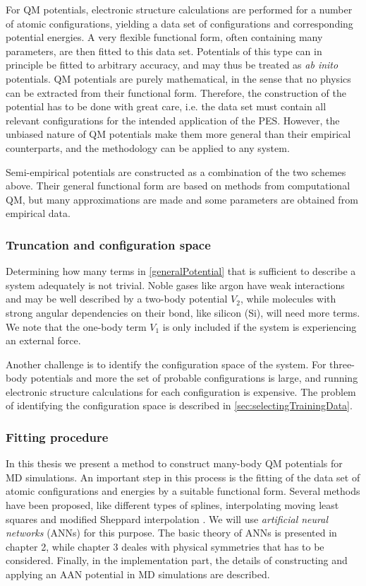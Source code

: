 \documentclass[twoside,english]{uiofysmaster}
\begin{document}
For QM potentials, electronic structure calculations are performed for a number of atomic configurations, yielding a data set
of configurations and corresponding potential energies. A very flexible functional form, often containing many parameters, 
are then fitted to this data set. Potentials of this type can in principle be fitted to arbitrary accuracy, and may thus 
be treated as \textit{ab inito} potentials. QM potentials are purely mathematical,
in the sense that no physics can be extracted from their functional form. Therefore, the construction of the potential
has to be done with great care, i.e. the data set must contain all relevant configurations for the intended application
of the PES. However, the unbiased nature of QM potentials make them more general than their empirical counterparts,
and the methodology can be applied to any system. 

Semi-empirical potentials are constructed as a combination of the two schemes above. Their general functional form
are based on methods from computational QM, but many approximations are made and some parameters are obtained from empirical data. 

\subsubsection{Truncation and configuration space}
Determining how many terms in \eqref{generalPotential} that is sufficient to 
describe a system adequately is not trivial. Noble gases like argon have weak interactions and 
may be well described by a two-body potential $V_2$, while molecules with strong angular dependencies on their bond, like
silicon (Si), will need more terms. We note that the one-body term $V_1$ is only included if the system 
is experiencing an external force. 

Another challenge is to identify the
configuration space of the system. For three-body potentials and more the set of probable configurations is large, and 
running electronic structure calculations for each configuration is expensive. The problem of identifying the configuration
space is described in \autoref{sec:selectingTrainingData}. 

\subsubsection{Fitting procedure}
In this thesis we present a method to construct many-body QM potentials for MD simulations.
An important step in this process is the fitting of the data set of atomic configurations and energies by 
a suitable functional form. Several methods have been proposed, like different types of splines, 
interpolating moving least squares \cite{Dawes08} and modified Sheppard interpolation \cite{Ischtwan94}. 
We will use \textit{artificial neural networks} (ANNs) for this purpose. 
The basic theory of ANNs 
is presented in chapter 2, while chapter 3 deales with physical symmetries that has to be considered. 
Finally, in the implementation part, the details of constructing and applying an AAN potential in MD simulations are described. 
\end{document}

